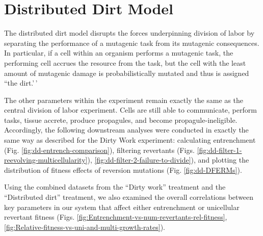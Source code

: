 \documentclass[
]{book}
\begin{document}
\hypertarget{distributed-dirt-model}{%
\chapter{Distributed Dirt Model}\label{distributed-dirt-model}}

The distributed dirt model disrupts the forces underpinning division of labor by separating the performance of a mutagenic task from its mutagenic consequences. In particular, if a cell within an organism performs a mutagenic task, the performing cell accrues the resource from the task, but the cell with the least amount of mutagenic damage is probabilistically mutated and thus is assigned ``the dirt.'\,'

The other parameters within the experiment remain exactly the same as the central division of labor experiment. Cells are still able to communicate, perform tasks, tissue accrete, produce propagules, and become propagule-ineligible. Accordingly, the following downstream analyses were conducted in exactly the same way as described for the Dirty Work experiment: calculating entrenchment (Fig. \ref{fig:dd-entrench-comparison}), filtering revertants (Figs. \ref{fig:dd-filter-1-reevolving-multicellularity}), \ref{fig:dd-filter-2-failure-to-divide}), and plotting the distribution of fitness effects of reversion mutations (Fig. \ref{fig:dd-DFERMs}).

Using the combined datasets from the ``Dirty work'' treatment and the ``Distributed dirt'' treatment, we also examined the overall correlations between key parameters in our system that affect either entrenchment or unicellular revertant fitness (Figs. \ref{fig:Entrenchment-vs-num-revertants-rel-fitness}, \ref{fig:Relative-fitness-vs-uni-and-multi-growth-rates}).
\end{document}
